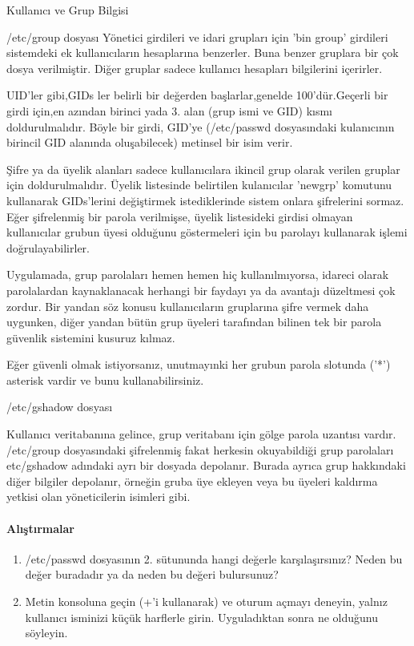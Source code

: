 \begin{section}{Kullanıcı ve Grup Bilgisi}
\begin{subsection}{/etc/group dosyası}
Yönetici girdileri ve idari grupları için 'bin group' girdileri sistemdeki ek kullanıcıların hesaplarına benzerler. Buna benzer gruplara bir çok dosya verilmiştir. Diğer gruplar sadece kullanıcı hesapları bilgilerini içerirler.

UID'ler gibi,GIDs ler belirli bir değerden başlarlar,genelde 100'dür.Geçerli bir girdi için,en azından birinci yada 3. alan (grup ismi ve GID) kısmı doldurulmalıdır. Böyle bir girdi, GID'ye (/etc/passwd dosyasındaki kulanıcının birincil GID alanında oluşabilecek) metinsel bir isim verir.

Şifre ya da üyelik alanları sadece kullanıcılara ikincil grup olarak verilen gruplar için doldurulmalıdır. Üyelik listesinde belirtilen kulanıcılar 'newgrp' komutunu kullanarak GIDs'lerini değiştirmek istediklerinde sistem onlara şifrelerini sormaz. Eğer şifrelenmiş bir parola verilmişse, üyelik listesideki girdisi olmayan kullanıcılar grubun üyesi olduğunu göstermeleri için bu parolayı kullanarak işlemi doğrulayabilirler.

Uygulamada, grup parolaları hemen hemen hiç kullanılmıyorsa, idareci olarak parolalardan kaynaklanacak herhangi bir faydayı ya da avantajı düzeltmesi çok zordur. Bir yandan söz konusu kullanıcıların gruplarına şifre vermek daha uygunken, diğer yandan bütün grup üyeleri tarafından bilinen tek bir parola güvenlik sistemini kusuruz kılmaz.

Eğer güvenli olmak istiyorsanız, unutmayınki her grubun parola slotunda ('*') asterisk vardir ve bunu kullanabilirsiniz.
\end{subsection}
\begin{subsection}{/etc/gshadow dosyası}

Kullanıcı veritabanına gelince, grup veritabanı için gölge parola uzantısı vardır. /etc/group dosyasındaki şifrelenmiş fakat herkesin okuyabildiği grup parolaları etc/gshadow adındaki ayrı bir dosyada depolanır. Burada ayrıca grup hakkındaki diğer bilgiler depolanır, örneğin gruba üye ekleyen veya bu üyeleri kaldırma yetkisi olan yöneticilerin isimleri gibi.
\end{subsection}
\paragraph{{\Huge{\PencilLeftDown}}Alıştırmalar}{
\begin{enumerate}
\item /etc/passwd dosyasının 2. sütununda hangi değerle karşılaşırsınız? Neden bu değer buradadır ya da neden bu değeri bulursunuz?
\item Metin konsoluna geçin (\Alt+'i kullanarak) ve oturum açmayı deneyin, yalnız kullanıcı isminizi küçük harflerle girin. Uyguladıktan sonra ne olduğunu söyleyin.
\end{enumerate}
}
\end{section}
